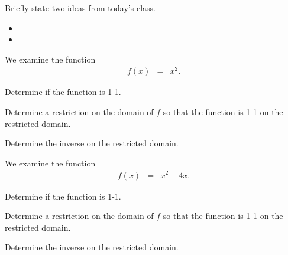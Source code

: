 \postClass

\begin{problem}
\item Briefly state two ideas from today's class.
  \begin{itemize}
  \item 
  \item 
  \end{itemize}
\item  We examine the function
	\begin{eqnarray*}
		f(x) & = & x^2.
	\end{eqnarray*}
  \begin{subproblem}
    \item Determine if the function is 1-1.
    \item Determine a restriction on the domain of $f$ so that the function 
	    is 1-1 on the restricted domain.
    \item Determine the inverse on the restricted domain.
  \end{subproblem}
\item  We examine the function
	\begin{eqnarray*}
		f(x) & = & x^2-4x.
	\end{eqnarray*}
  \begin{subproblem}
    \item Determine if the function is 1-1.
    \item Determine a restriction on the domain of $f$ so that the function 
	    is 1-1 on the restricted domain.
    \item Determine the inverse on the restricted domain.
  \end{subproblem}
\end{problem}



